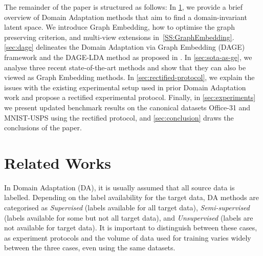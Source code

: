 \documentclass[journal]{IEEEtran}
\begin{document}
The remainder of the paper is structured as follows: In \cref{sec:related-work}, we provide a brief overview of Domain Adaptation methods that aim to find a domain-invariant latent space. We introduce Graph Embedding, how to optimise the graph preserving criterion, and multi-view extensions in~\cref{SS:GraphEmbedding}. \cref{sec:dage} delineates the Domain Adaptation via Graph Embedding (DAGE) framework and the DAGE-LDA method as proposed in \cite{hedegaard2020supervised}. In \cref{sec:sota-as-ge}, we analyse three recent state-of-the-art methods and show that they can also be viewed as Graph Embedding methods. In \cref{sec:rectified-protocol}, we explain the issues with the existing experimental setup used in prior Domain Adaptation work and propose a rectified experimental protocol. Finally, in \cref{sec:experiments} we present updated benchmark results on the canonical datasets Office-31 and MNIST-USPS using the rectified protocol, and \cref{sec:conclusion} draws the conclusions of the paper.




 \section{Related Works} \label{sec:related-work}



In Domain Adaptation (DA), it is usually assumed that all source data is labelled. Depending on the label availability for the target data, DA methods are categorised as \textit{Supervised} (labels available for all target data), \textit{Semi-supervised} (labels available for some but not all target data), and \textit{Unsupervised} (labels are not available for target data). It is important to distinguish between these cases, as experiment protocols and the volume of data used for training varies widely between the three cases, even using the same datasets. 
\end{document}
